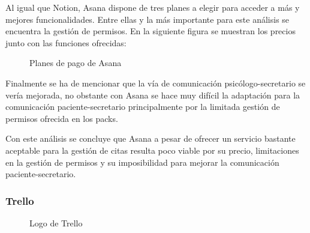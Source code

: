 Al igual que Notion, Asana dispone de tres planes a elegir para acceder a más y mejores funcionalidades. Entre ellas y la más importante para este análisis se encuentra la gestión de permisos. En la siguiente figura se muestran los precios junto con las funciones ofrecidas:

\begin{figure}[H]
    \caption{Planes de pago de Asana}
    \label{fig:asana-precios}
\end{figure}

Finalmente se ha de mencionar que la vía de comunicación psicólogo-secretario se vería mejorada, no obstante con Asana se hace muy difícil la adaptación para la comunicación paciente-secretario principalmente por la limitada gestión de permisos ofrecida en los packs. \bigskip

Con este análisis se concluye que Asana a pesar de ofrecer un servicio bastante aceptable para la gestión de citas resulta poco viable por su precio, limitaciones en la gestión de permisos y su imposibilidad para mejorar la comunicación paciente-secretario.


\subsubsection*{Trello}

\begin{figure}[H]
    \caption{Logo de Trello}
    \label{fig:trello-logo}
\end{figure}

